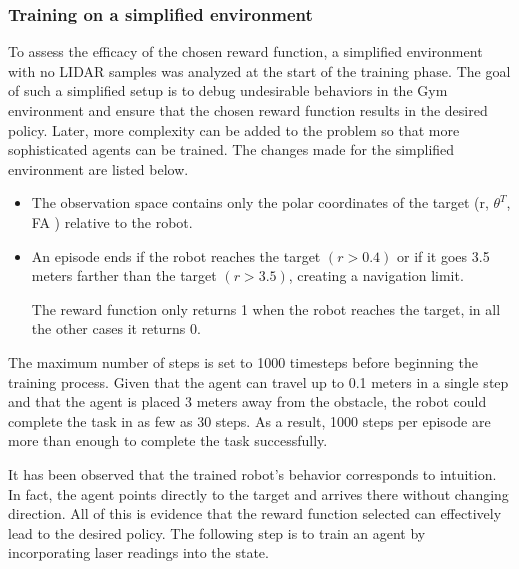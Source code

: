 \documentclass[conference]{IEEEtran}
\begin{document}
\subsubsection{Training on a simplified environment} 
To assess the efficacy of the chosen reward function, a simplified environment with no LIDAR samples was analyzed at the start of the training phase.
The goal of such a simplified setup is to debug undesirable behaviors in the Gym environment and ensure that the chosen reward function results in the desired policy. Later, more complexity can be added to the problem so that more sophisticated agents can be trained. The changes made for the simplified environment are listed below.\par
\begin{itemize}
    \item The observation space contains only the polar coordinates of the target (r, $\theta^{T}$, FA ) relative to the robot.
    \item  An episode ends if the robot reaches the target $(r > 0.4)$ or if it goes 3.5 meters farther than the target $(r > 3.5)$, creating a navigation limit.
    \par The reward function only returns 1 when the robot reaches the target, in all the other cases it returns 0.
\end{itemize}
The maximum number of steps is set to 1000 timesteps before beginning the training process. Given that the agent can travel up to 0.1 meters in a single step and that the agent is placed 3 meters away from the obstacle, the robot could complete the task in as few as 30 steps. As a result, 1000 steps per episode are more than enough to complete the task successfully.

It has been observed that the trained robot's behavior corresponds to intuition. In fact, the agent points directly to the target and arrives there without changing direction. All of this is evidence that the reward function selected can effectively lead to the desired policy. The following step is to train an agent by incorporating laser readings into the state.
\end{document}
